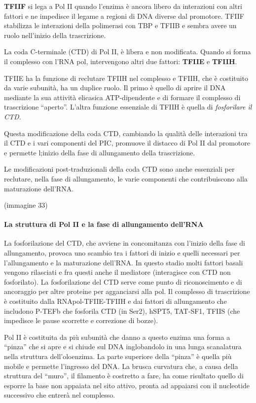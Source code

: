 \documentclass[]{article}
\begin{document}
\textbf{TFIIF} si lega a Pol II quando l'enzima è ancora libero da
interazioni con altri fattori e ne impedisce il legame a regioni di DNA
diverse dal promotore. TFIIF stabilizza le interazioni della polimerasi
con TBP e TFIIB e sembra avere un ruolo nell'inizio della trascrizione.

La coda C-terminale (CTD) di Pol II, è libera e non modificata. Quando
si forma il complesso con l'RNA pol, intervengono altri due fattori:
\textbf{TFIIE} e \textbf{TFIIH}.

TFIIE ha la funzione di reclutare TFIIH nel complesso e TFIIH, che è
costituito da varie subunità, ha un duplice ruolo. Il primo è quello di
aprire il DNA mediante la sua attività elicasica ATP-dipendente e di
formare il complesso di trascrizione ``aperto''. L'altra funzione
essenziale di TFIIH è quella di \emph{fosforilare il CTD}.

Questa modificazione della coda CTD, cambiando la qualità delle
interazioni tra il CTD e i vari componenti del PIC, promuove il distacco
di Pol II dal promotore e permette l;inizio della fase di allungamento
della trascrizione.

Le modificazioni post-traduzionali della coda CTD sono anche essenziali
per reclutare, nella fase di allungamento, le varie componenti che
contribuiscono alla maturazione dell'RNA.

(immagine 33)

\paragraph{La struttura di Pol II e la fase di allungamento
dell'RNA}\label{la-struttura-di-pol-ii-e-la-fase-di-allungamento-dellrna}

La fosforilazione del CTD, che avviene in concomitanza con l'inizio
della fase di allungamento, provoca uno scambio tra i fattori di inizio
e quelli necessari per l'allungamento e la maturazione dell'RNA. In
questo stadio molti fattori basali vengono rilasciati e fra questi anche
il mediatore (interagisce con CTD non fosforilato). La fosforilazione
del CTD serve come punto di riconoscimento e di ancoraggio per altre
proteine per agganciarsi alla pol. Il complesso di trascrizione è
costituito dalla RNApol-TFIIE-TFIIH e dai fattori di allungamento che
includono P-TEFb che fosforila CTD (in Ser2), hSPT5, TAT-SF1, TFIIS (che
impedisce le pause scorrette e correzione di bozze).

Pol II è costituita da più subunità che danno a questo enzima una forma
a ``pinza'' che si apre e si chiude sul DNA inglobandolo in una lunga
scanalatura nella struttura dell'oloenzima. La parte superiore della
``pinza'' è quella più mobile e permette l'ingresso del DNA. La brusca
curvatura che, a causa della struttura del ``muro'', il filamento è
costretto a fare, ha come risultato quello di esporre la base non
appaiata nel sito attivo, pronta ad appaiarsi con il nucleotide
successivo che entrerà nel complesso.
\end{document}

